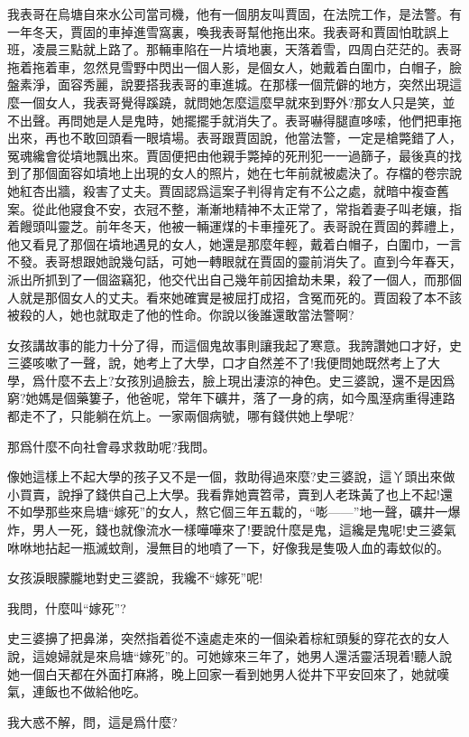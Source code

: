 \documentclass[a6paper]{article}
\begin{document}
我表哥在烏塘自來水公司當司機，他有一個朋友叫賈固，在法院工作，是法警。有一年冬天，賈固的車掉進雪窩裏，喚我表哥幫他拖出來。我表哥和賈固怕耽誤上班，凌晨三點就上路了。那輛車陷在一片墳地裏，天落着雪，四周白茫茫的。表哥拖着拖着車，忽然見雪野中閃出一個人影，是個女人，她戴着白圍巾，白帽子，臉盤素淨，面容秀麗，說要搭我表哥的車進城。在那樣一個荒僻的地方，突然出現這麼一個女人，我表哥覺得蹊蹺，就問她怎麼這麼早就來到野外?那女人只是笑，並不出聲。再問她是人是鬼時，她擺擺手就消失了。表哥嚇得腿直哆嗦，他們把車拖出來，再也不敢回頭看一眼墳場。表哥跟賈固說，他當法警，一定是槍斃錯了人，冤魂纔會從墳地飄出來。賈固便把由他親手斃掉的死刑犯一一過篩子，最後真的找到了那個面容如墳地上出現的女人的照片，她在七年前就被處決了。存檔的卷宗說她紅杏出牆，殺害了丈夫。賈固認爲這案子判得肯定有不公之處，就暗中複查舊案。從此他寢食不安，衣冠不整，漸漸地精神不太正常了，常指着妻子叫老孃，指着饅頭叫靈芝。前年冬天，他被一輛運煤的卡車撞死了。表哥說在賈固的葬禮上，他又看見了那個在墳地遇見的女人，她還是那麼年輕，戴着白帽子，白圍巾，一言不發。表哥想跟她說幾句話，可她一轉眼就在賈固的靈前消失了。直到今年春天，派出所抓到了一個盜竊犯，他交代出自己幾年前因搶劫未果，殺了一個人，而那個人就是那個女人的丈夫。看來她確實是被屈打成招，含冤而死的。賈固殺了本不該被殺的人，她也就取走了他的性命。你說以後誰還敢當法警啊?

女孩講故事的能力十分了得，而這個鬼故事則讓我起了寒意。我誇讚她口才好，史三婆咳嗽了一聲，說，她考上了大學，口才自然差不了!我便問她既然考上了大學，爲什麼不去上?女孩別過臉去，臉上現出淒涼的神色。史三婆說，還不是因爲窮?她媽是個藥簍子，他爸呢，常年下礦井，落了一身的病，如今風溼病重得連路都走不了，只能躺在炕上。一家兩個病號，哪有錢供她上學呢?

那爲什麼不向社會尋求救助呢?我問。

像她這樣上不起大學的孩子又不是一個，救助得過來麼?史三婆說，這丫頭出來做小買賣，說掙了錢供自己上大學。我看靠她賣笤帚，賣到人老珠黃了也上不起!還不如學那些來烏塘“嫁死”的女人，熬它個三年五載的，“嘭——”地一聲，礦井一爆炸，男人一死，錢也就像流水一樣嘩嘩來了!要說什麼是鬼，這纔是鬼呢!史三婆氣咻咻地拈起一瓶滅蚊劑，漫無目的地噴了一下，好像我是隻吸人血的毒蚊似的。

女孩淚眼朦朧地對史三婆說，我纔不“嫁死”呢!

我問，什麼叫“嫁死”?

史三婆擤了把鼻涕，突然指着從不遠處走來的一個染着棕紅頭髮的穿花衣的女人說，這媳婦就是來烏塘“嫁死”的。可她嫁來三年了，她男人還活靈活現着!聽人說她一個白天都在外面打麻將，晚上回家一看到她男人從井下平安回來了，她就嘆氣，連飯也不做給他吃。

我大惑不解，問，這是爲什麼?
\end{document}

